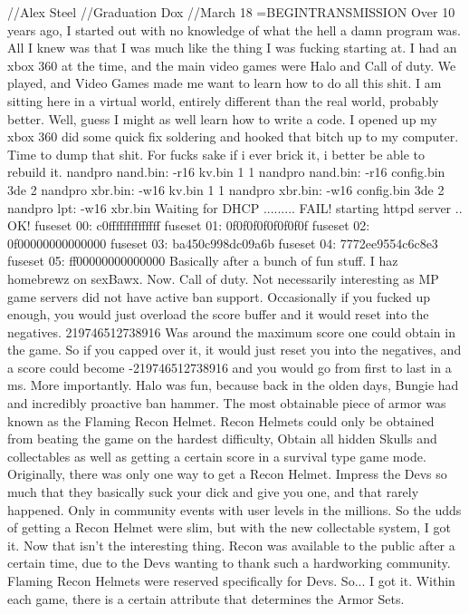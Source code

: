 //Alex Steel
//Graduation Dox
//March 18
=BEGINTRANSMISSION
Over 10 years ago, I started out with no knowledge of what the hell a damn program was.
All I knew was that I was much like the thing I was fucking starting at.
I had an xbox 360 at the time, and the main video games were Halo and Call of duty.
We played, and Video Games made me want to learn how to do all this shit.
I am sitting here in a virtual world, entirely different than the real world, probably better.
Well, guess I might as well learn how to write a code.
I opened up my xbox 360 did some quick fix soldering and hooked that bitch up to my computer.
Time to dump that shit. For fucks sake if i ever brick it, i better be able to rebuild it.
nandpro nand.bin: -r16 kv.bin 1 1
nandpro nand.bin: -r16 config.bin 3de 2
nandpro xbr.bin: -w16 kv.bin 1 1
nandpro xbr.bin: -w16 config.bin 3de 2
nandpro lpt: -w16 xbr.bin
Waiting for DHCP ......... FAIL!
starting httpd server .. OK!
fuseset 00: c0ffffffffffffff
fuseset 01: 0f0f0f0f0f0f0f0f
fuseset 02: 0f00000000000000
fuseset 03: ba450c998dc09a6b
fuseset 04: 7772ee9554c6c8e3
fuseset 05: ff00000000000000
Basically after a bunch of fun stuff. I haz homebrewz on sexBawx.
Now. Call of duty. Not necessarily interesting as MP game servers 
did not have active ban support. Occasionally if you fucked up enough, 
you would just overload the score buffer and it would reset into the negatives.
219746512738916 Was around the maximum score one could obtain in the game.
So if you capped over it, it would just reset you into the negatives, and a score
could become -219746512738916 and you would go from first to last in a ms.
More importantly. Halo was fun, because back in the olden days, Bungie had
and incredibly proactive ban hammer. The most obtainable piece of armor
was known as the Flaming Recon Helmet. Recon Helmets could only be obtained
from beating the game on the hardest difficulty, Obtain all hidden Skulls and collectables
as well as getting a certain score in a survival type game mode. Originally, there was only
one way to get a Recon Helmet. Impress the Devs so much that they basically suck your dick
and give you one, and that rarely happened. Only in community events with user levels in the millions.
So the udds of getting a Recon Helmet were slim, but with the new collectable system, I got it.
Now that isn't the interesting thing. Recon was available to the public after a certain time,
due to the Devs wanting to thank such a hardworking community. Flaming Recon Helmets were
reserved specifically for Devs. 
So... I got it.
Within each game, there is a certain attribute that determines the Armor Sets.
